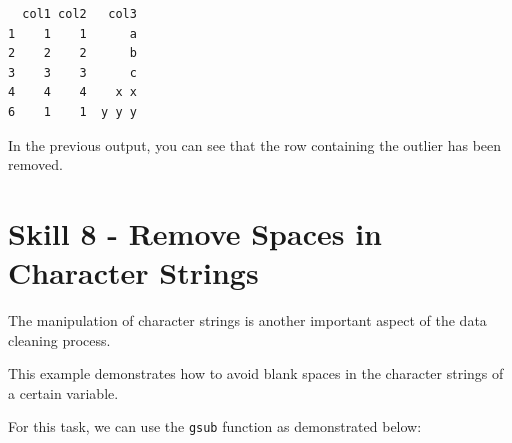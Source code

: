 \documentclass[
  letterpaper,
  DIV=11,
  numbers=noendperiod]{scrreprt}
\newenvironment{Shaded}{\begin{snugshade}}{\end{snugshade}}
\newcommand{\CommentTok}[1]{\textcolor[rgb]{0.37,0.37,0.37}{#1}}
\newcommand{\FunctionTok}[1]{\textcolor[rgb]{0.28,0.35,0.67}{#1}}
\newcommand{\NormalTok}[1]{\textcolor[rgb]{0.00,0.23,0.31}{#1}}
\newcommand{\OtherTok}[1]{\textcolor[rgb]{0.00,0.23,0.31}{#1}}
\newcommand{\SpecialCharTok}[1]{\textcolor[rgb]{0.37,0.37,0.37}{#1}}
\newcommand{\StringTok}[1]{\textcolor[rgb]{0.13,0.47,0.30}{#1}}
\begin{document}
\begin{Shaded}
\end{Shaded}

\begin{verbatim}
  col1 col2   col3
1    1    1      a
2    2    2      b
3    3    3      c
4    4    4    x x
6    1    1  y y y
\end{verbatim}

In the previous output, you can see that the row containing the outlier
has been removed.

\section*{Skill 8 - Remove Spaces in Character
Strings}\label{skill-8---remove-spaces-in-character-strings}


The manipulation of character strings is another important aspect of the
data cleaning process.

This example demonstrates how to avoid blank spaces in the character
strings of a certain variable.

For this task, we can use the \texttt{gsub} function as demonstrated
below:

\begin{Shaded}
\end{Shaded}
\end{document}
